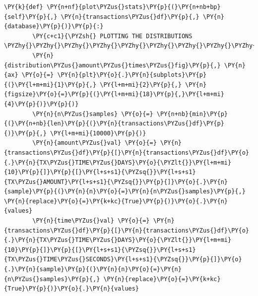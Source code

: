 \begin{tcolorbox}[breakable, size=fbox, boxrule=1pt, pad at break*=1mm,colback=cellbackground, colframe=cellborder]
\begin{Verbatim}[commandchars=\\\{\}]
    \PY{k}{def} \PY{n+nf}{plot\PYZus{}stats}\PY{p}{(}\PY{n+nb+bp}{self}\PY{p}{,} \PY{n}{transactions\PYZus{}df}\PY{p}{,} \PY{n}{database}\PY{p}{)}\PY{p}{:}
        \PY{c+c1}{\PYZsh{} PLOTTING THE DISTRIBUTIONS \PYZhy{}\PYZhy{}\PYZhy{}\PYZhy{}\PYZhy{}\PYZhy{}\PYZhy{}\PYZhy{}\PYZhy{}\PYZhy{}\PYZhy{}\PYZhy{}\PYZhy{}\PYZhy{}\PYZhy{}\PYZhy{}\PYZhy{}\PYZhy{}\PYZhy{}\PYZhy{}\PYZhy{}\PYZhy{}\PYZhy{}\PYZhy{}\PYZhy{}\PYZhy{}\PYZhy{}\PYZhy{}\PYZhy{}\PYZhy{}\PYZhy{}\PYZhy{}\PYZhy{}\PYZhy{}\PYZhy{}\PYZhy{}\PYZhy{}\PYZhy{}\PYZhy{}\PYZhy{}\PYZhy{}\PYZhy{}\PYZhy{}\PYZhy{}\PYZhy{}\PYZhy{}\PYZhy{}\PYZhy{}\PYZhy{}\PYZhy{}\PYZhy{}\PYZhy{}\PYZhy{}\PYZhy{}\PYZhy{}\PYZhy{}\PYZhy{}}
        \PY{n}{distribution\PYZus{}amount\PYZus{}times\PYZus{}fig}\PY{p}{,} \PY{n}{ax} \PY{o}{=} \PY{n}{plt}\PY{o}{.}\PY{n}{subplots}\PY{p}{(}\PY{l+m+mi}{1}\PY{p}{,} \PY{l+m+mi}{2}\PY{p}{,} \PY{n}{figsize}\PY{o}{=}\PY{p}{(}\PY{l+m+mi}{18}\PY{p}{,}\PY{l+m+mi}{4}\PY{p}{)}\PY{p}{)}
        \PY{n}{n\PYZus{}samples} \PY{o}{=} \PY{n+nb}{min}\PY{p}{(}\PY{n+nb}{len}\PY{p}{(}\PY{n}{transactions\PYZus{}df}\PY{p}{)}\PY{p}{,} \PY{l+m+mi}{10000}\PY{p}{)}
        \PY{n}{amount\PYZus{}val} \PY{o}{=} \PY{n}{transactions\PYZus{}df}\PY{p}{[}\PY{n}{transactions\PYZus{}df}\PY{o}{.}\PY{n}{TX\PYZus{}TIME\PYZus{}DAYS}\PY{o}{\PYZlt{}}\PY{l+m+mi}{10}\PY{p}{]}\PY{p}{[}\PY{l+s+s1}{\PYZsq{}}\PY{l+s+s1}{TX\PYZus{}AMOUNT}\PY{l+s+s1}{\PYZsq{}}\PY{p}{]}\PY{o}{.}\PY{n}{sample}\PY{p}{(}\PY{n}{n}\PY{o}{=}\PY{n}{n\PYZus{}samples}\PY{p}{,} \PY{n}{replace}\PY{o}{=}\PY{k+kc}{True}\PY{p}{)}\PY{o}{.}\PY{n}{values}
        \PY{n}{time\PYZus{}val} \PY{o}{=} \PY{n}{transactions\PYZus{}df}\PY{p}{[}\PY{n}{transactions\PYZus{}df}\PY{o}{.}\PY{n}{TX\PYZus{}TIME\PYZus{}DAYS}\PY{o}{\PYZlt{}}\PY{l+m+mi}{10}\PY{p}{]}\PY{p}{[}\PY{l+s+s1}{\PYZsq{}}\PY{l+s+s1}{TX\PYZus{}TIME\PYZus{}SECONDS}\PY{l+s+s1}{\PYZsq{}}\PY{p}{]}\PY{o}{.}\PY{n}{sample}\PY{p}{(}\PY{n}{n}\PY{o}{=}\PY{n}{n\PYZus{}samples}\PY{p}{,} \PY{n}{replace}\PY{o}{=}\PY{k+kc}{True}\PY{p}{)}\PY{o}{.}\PY{n}{values}
        

\end{Verbatim}
\end{tcolorbox}
